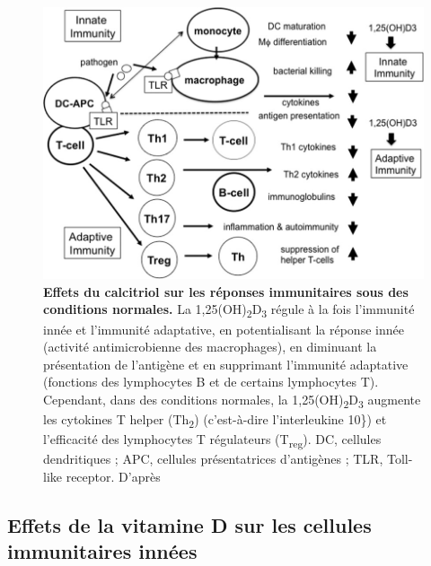 \documentclass[
  a4paper,
  DIV=11,
  numbers=noendperiod,
  listof=totoc]{scrreprt}
\begin{document}
\begin{figure}

{\centering \includegraphics{figures/vd-immune-effect.jpg}

}

\caption[\textbf{Effets du calcitriol sur les réponses immunitaires sous
des conditions normales.}]{\label{fig-vd-immune-effect}\textbf{Effets du
calcitriol sur les réponses immunitaires sous des conditions normales.}
La 1,25(OH)\textsubscript{2}D\textsubscript{3} régule à la fois
l'immunité innée et l'immunité adaptative, en potentialisant la réponse
innée (activité antimicrobienne des macrophages), en diminuant la
présentation de l'antigène et en supprimant l'immunité adaptative
(fonctions des lymphocytes B et de certains lymphocytes T). Cependant,
dans des conditions normales, la
1,25(OH)\textsubscript{2}D\textsubscript{3} augmente les cytokines T
helper (Th\textsubscript{2}) (c'est-à-dire l'interleukine 10\}) et
l'efficacité des lymphocytes T régulateurs (T\textsubscript{reg}). DC,
cellules dendritiques ; APC, cellules présentatrices d'antigènes ; TLR,
Toll-like receptor. D'après \textcite{Cutolo.2014}}

\end{figure}

\hypertarget{effets-de-la-vitamine-d-sur-les-cellules-immunitaires-innuxe9es}{%
\subsection{Effets de la vitamine D sur les cellules immunitaires
innées}\label{effets-de-la-vitamine-d-sur-les-cellules-immunitaires-innuxe9es}}
\end{document}
